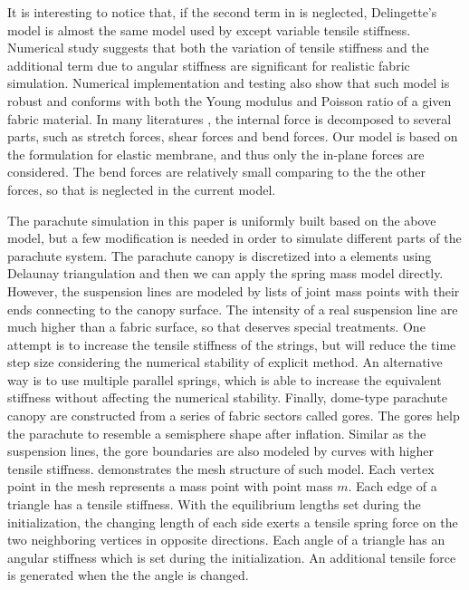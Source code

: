 It is interesting to notice that, if the second term in  is neglected, Delingette's model is almost the same model used by \cite{Kim2013} except variable tensile stiffness. Numerical study suggests that both the variation of tensile stiffness and the additional term due to angular stiffness are significant for realistic fabric simulation. Numerical implementation and testing also show that such model is robust and conforms with both the Young modulus and Poisson ratio of a given fabric material. In many literatures \cite{}, the internal force is decomposed to several parts, such as stretch forces, shear forces and bend forces. Our model is based on the formulation for elastic membrane, and thus only the in-plane forces are considered. The bend forces are relatively small comparing to the the other forces, so that is neglected in the current model.

The parachute simulation in this paper is uniformly built based on the above model, but a few modification is needed in order to simulate different parts of the parachute system. The parachute canopy is discretized into a elements using Delaunay triangulation and then we can apply the spring mass model directly. However, the suspension lines are modeled by lists of joint mass points with their ends connecting to the canopy surface. The intensity of a real suspension line are much higher than a fabric surface, so that deserves special treatments. One attempt is to increase the tensile stiffness of the strings, but will reduce the time step size considering the numerical stability of explicit method. An alternative way is to use multiple parallel springs, which is able to increase the equivalent stiffness without affecting the numerical stability. Finally, dome-type parachute canopy are constructed from a series of fabric sectors called gores. The gores help the parachute to resemble a semisphere shape after inflation. Similar as the suspension lines, the gore boundaries are also modeled by curves with higher tensile stiffness.  demonstrates the mesh structure of such model. Each vertex point in the mesh represents a
mass point with point mass $m$. Each edge of a triangle has a tensile stiffness.
With the equilibrium lengths set during the initialization, the changing length
of each side exerts a tensile spring force on the two neighboring vertices in
opposite directions.  Each angle of a triangle has an angular stiffness which is
set during the initialization. An additional tensile force is generated when the
the angle is changed.

